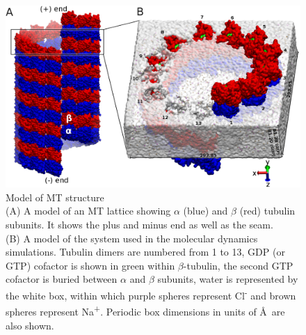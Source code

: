 \documentclass[11pt]{report}
\begin{document}
\begin{figure}[h]
  \centering
  \includegraphics[width=0.98\linewidth]{images/Fig1.pdf}
  \caption[Model of MT structure]{Model of MT structure
  \\
      (A) A model of an MT lattice showing $\alpha$ (blue) and $\beta$ (red) tubulin subunits. It shows the plus and minus end as well as the seam.
      \\
      (B) A model of the system used in the molecular dynamics simulations.
      Tubulin dimers are numbered from 1 to 13,  GDP (or GTP) cofactor is shown
      in green within $\beta$-tubulin, the second GTP cofactor is buried between $\alpha$ and $\beta$ subunits, water is represented by the white box, within which
      purple spheres represent Cl\textsuperscript{-} and brown spheres represent Na\textsuperscript{+}.
      Periodic box dimensions in units of \AA\ are also shown.}
    \label{fig:System}
\end{figure}
\end{document}

